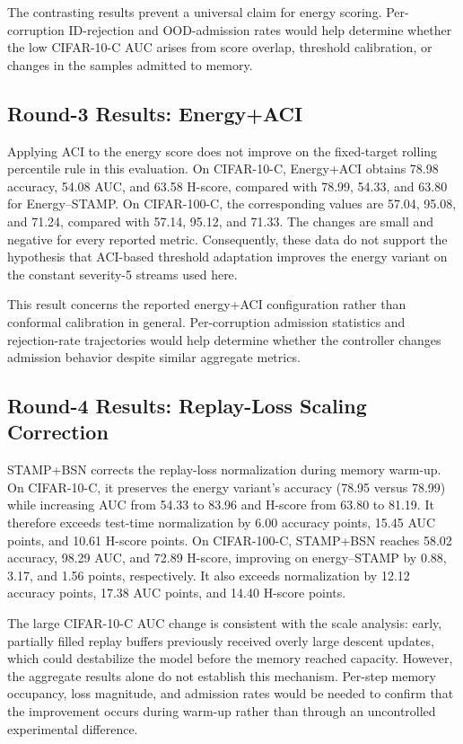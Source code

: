 The contrasting results prevent a universal claim for energy scoring.
Per-corruption ID-rejection and OOD-admission rates would help determine
whether the low CIFAR-10-C AUC arises from score overlap, threshold
calibration, or changes in the samples admitted to memory.

\subsection{Round-3 Results: Energy+ACI}
Applying ACI to the energy score does not improve on the fixed-target rolling
percentile rule in this evaluation. On CIFAR-10-C, Energy+ACI obtains 78.98
accuracy, 54.08 AUC, and 63.58 H-score, compared with 78.99, 54.33, and 63.80
for Energy--STAMP. On CIFAR-100-C, the corresponding values are 57.04, 95.08,
and 71.24, compared with 57.14, 95.12, and 71.33. The changes are small and
negative for every reported metric. Consequently, these data do not support the
hypothesis that ACI-based threshold adaptation improves the energy variant on
the constant severity-5 streams used here.

This result concerns the reported energy+ACI configuration rather than conformal
calibration in general. Per-corruption admission statistics and rejection-rate
trajectories would help determine whether the controller changes admission
behavior despite similar aggregate metrics.

\subsection{Round-4 Results: Replay-Loss Scaling Correction}
STAMP+BSN corrects the replay-loss normalization during memory warm-up. On
CIFAR-10-C, it preserves the energy variant's accuracy (78.95 versus 78.99)
while increasing AUC from 54.33 to 83.96 and H-score from 63.80 to 81.19. It
therefore exceeds test-time normalization by 6.00 accuracy points, 15.45 AUC
points, and 10.61 H-score points. On CIFAR-100-C, STAMP+BSN reaches 58.02
accuracy, 98.29 AUC, and 72.89 H-score, improving on energy--STAMP by 0.88,
3.17, and 1.56 points, respectively. It also exceeds normalization by 12.12
accuracy points, 17.38 AUC points, and 14.40 H-score points.

The large CIFAR-10-C AUC change is consistent with the scale analysis: early,
partially filled replay buffers previously received overly large descent
updates, which could destabilize the model before the memory reached capacity.
However, the aggregate results alone do not establish this mechanism. Per-step
memory occupancy, loss magnitude, and admission rates would be needed to
confirm that the improvement occurs during warm-up rather than through an
uncontrolled experimental difference.
